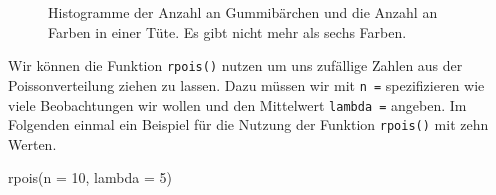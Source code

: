 \documentclass[
  letterpaper,
]{scrbook}
\newenvironment{Shaded}{\begin{snugshade}}{\end{snugshade}}
\newcommand{\AttributeTok}[1]{\textcolor[rgb]{0.40,0.45,0.13}{#1}}
\newcommand{\DecValTok}[1]{\textcolor[rgb]{0.68,0.00,0.00}{#1}}
\newcommand{\FunctionTok}[1]{\textcolor[rgb]{0.28,0.35,0.67}{#1}}
\newcommand{\NormalTok}[1]{\textcolor[rgb]{0.00,0.23,0.31}{#1}}
\begin{document}
\begin{figure}
\begin{minipage}[t]{0.50\linewidth}
{\centering 


}

\end{minipage}%

\caption{\label{fig-pois-01}Histogramme der Anzahl an Gummibärchen und
die Anzahl an Farben in einer Tüte. Es gibt nicht mehr als sechs
Farben.}

\end{figure}

Wir können die Funktion \texttt{rpois()} nutzen um uns zufällige Zahlen
aus der Poissonverteilung ziehen zu lassen. Dazu müssen wir mit
\texttt{n\ =} spezifizieren wie viele Beobachtungen wir wollen und den
Mittelwert \texttt{lambda\ =} angeben. Im Folgenden einmal ein Beispiel
für die Nutzung der Funktion \texttt{rpois()} mit zehn Werten.

\begin{Shaded}
\begin{Highlighting}[]
\FunctionTok{rpois}\NormalTok{(}\AttributeTok{n =} \DecValTok{10}\NormalTok{, }\AttributeTok{lambda =} \DecValTok{5}\NormalTok{)}
\end{Highlighting}
\end{Shaded}
\end{document}

